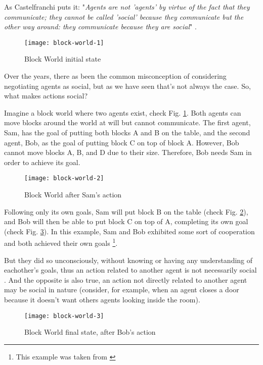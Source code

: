 As Castelfranchi puts it: "\textit{Agents are not 'agents' by virtue of the fact that they communicate;
they cannot be called 'social' because they communicate but the other way around: they communicate because they are social}" \cite{castelfranchi:socialactions}.

\begin{figure}
  \centering
    \texttt{[image: block-world-1]}
  \caption{Block World initial state}
  \label{fig:block-world-1}
\end{figure}

Over the years, there as been the common misconception of considering negotiating agents as social, but as we have seen that's not always the case.
So, what makes actions social?

Imagine a block world where two agents exist, check Fig. \ref{fig:block-world-1}.
Both agents can move blocks around the world at will but cannot communicate.
The first agent, Sam, has the goal of putting both blocks A and B on the table, and the second agent, Bob, as the goal of putting block C on top of block A.
However, Bob cannot move blocks A, B, and D due to their size.
Therefore, Bob needs Sam in order to achieve its goal.

\begin{figure}
  \centering
    \texttt{[image: block-world-2]}
  \caption{Block World after Sam's action}
  \label{fig:block-world-2}
\end{figure}

Following only its own goals, Sam will put block B on the table (check Fig. \ref{fig:block-world-2}), and Bob will then be able to put block C on top of A, completing its own goal (check Fig. \ref{fig:block-world-3}).
In this example, Sam and Bob exhibited some sort of cooperation and both achieved their own goals \footnote{This example was taken from \cite{castelfranchi:socialactions}}.

But they did so unconsciously, without knowing or having any understanding of eachother's goals, thus an action related to another agent is not necessarily social \cite{castelfranchi:individualsocialaction}.
And the opposite is also true, an action not directly related to another agent may be social in nature (consider, for example, when an agent closes a door because it doesn't want others agents looking inside the room).

\begin{figure}
  \centering
    \texttt{[image: block-world-3]}
  \caption{Block World final state, after Bob's action}
  \label{fig:block-world-3}
\end{figure}

